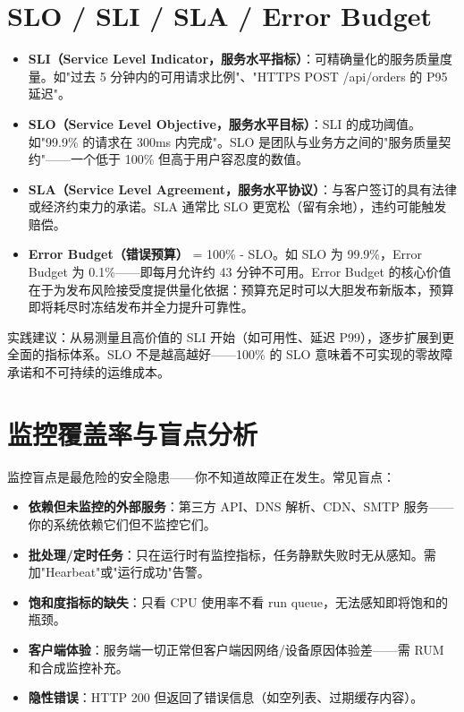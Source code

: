 \documentclass[12pt,UTF8]{ctexbook}
\begin{document}
  \section{SLO / SLI / SLA / Error Budget}

\begin{itemize}
	\item \textbf{SLI（Service Level Indicator，服务水平指标）}：可精确量化的服务质量度量。如"过去 5 分钟内的可用请求比例"、"HTTPS POST /api/orders 的 P95 延迟"。
	\item \textbf{SLO（Service Level Objective，服务水平目标）}：SLI 的成功阈值。如"99.9\% 的请求在 300ms 内完成"。SLO 是团队与业务方之间的"服务质量契约"——一个低于 100\% 但高于用户容忍度的数值。
	\item \textbf{SLA（Service Level Agreement，服务水平协议）}：与客户签订的具有法律或经济约束力的承诺。SLA 通常比 SLO 更宽松（留有余地），违约可能触发赔偿。
	\item \textbf{Error Budget（错误预算）} = 100\% - SLO。如 SLO 为 99.9\%，Error Budget 为 0.1\%——即每月允许约 43 分钟不可用。Error Budget 的核心价值在于为发布风险接受度提供量化依据：预算充足时可以大胆发布新版本，预算即将耗尽时冻结发布并全力提升可靠性。
\end{itemize}

实践建议：从易测量且高价值的 SLI 开始（如可用性、延迟 P99），逐步扩展到更全面的指标体系。SLO 不是越高越好——100\% 的 SLO 意味着不可实现的零故障承诺和不可持续的运维成本。

  \section{监控覆盖率与盲点分析}

监控盲点是最危险的安全隐患——你不知道故障正在发生。常见盲点：

\begin{itemize}
	\item \textbf{依赖但未监控的外部服务}：第三方 API、DNS 解析、CDN、SMTP 服务——你的系统依赖它们但不监控它们。
	\item \textbf{批处理/定时任务}：只在运行时有监控指标，任务静默失败时无从感知。需加"Hearbeat"或"运行成功"告警。
	\item \textbf{饱和度指标的缺失}：只看 CPU 使用率不看 run queue，无法感知即将饱和的瓶颈。
	\item \textbf{客户端体验}：服务端一切正常但客户端因网络/设备原因体验差——需 RUM 和合成监控补充。
	\item \textbf{隐性错误}：HTTP 200 但返回了错误信息（如空列表、过期缓存内容）。
\end{itemize}
\end{document}
